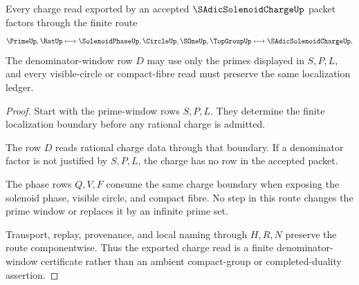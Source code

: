 \begin{theorem}
\label{thm:s-adic-solenoid-charge-denominator-window-route}
Every charge read exported by an accepted $\SAdicSolenoidChargeUp$ packet factors through the finite route
$$
\PrimeUp,\RatUp
\longmapsto
\SolenoidPhaseUp,\CircleUp,\SOneUp,\TopGroupUp
\longmapsto
\SAdicSolenoidChargeUp .
$$
The denominator-window row $D$ may use only the primes displayed in $S,P,L$, and every visible-circle or compact-fibre read must preserve the same localization ledger.
\end{theorem}
\begin{proof}
Start with the prime-window rows $S,P,L$. They determine the finite localization boundary before any rational charge is admitted.

The row $D$ reads rational charge data through that boundary. If a denominator factor is not justified by $S,P,L$, the charge has no row in the accepted packet.

The phase rows $Q,V,F$ consume the same charge boundary when exposing the solenoid phase, visible circle, and compact fibre. No step in this route changes the prime window or replaces it by an infinite prime set.

Transport, replay, provenance, and local naming through $H,R,N$ preserve the route componentwise. Thus the exported charge read is a finite denominator-window certificate rather than an ambient compact-group or completed-duality assertion.
\end{proof}




